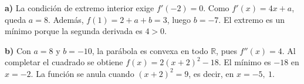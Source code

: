 \textbf{a)} La condición de extremo interior exige $f'(-2)=0$. Como $f'(x)=4x+a$, queda $a=8$. Además, $f(1)=2+a+b=3$, luego $\boxed{b=-7}$. El extremo es un mínimo porque la segunda derivada es $4>0$.

\textbf{b)} Con $a=8$ y $b=-10$, la parábola es convexa en todo $\mathbb R$, pues $f''(x)=4$. Al completar el cuadrado se obtiene $f(x)=2(x+2)^2-18$. El mínimo es $\boxed{-18}$ en $x=-2$. La función se anula cuando $(x+2)^2=9$, es decir, en $\boxed{x=-5,\ 1}$.
